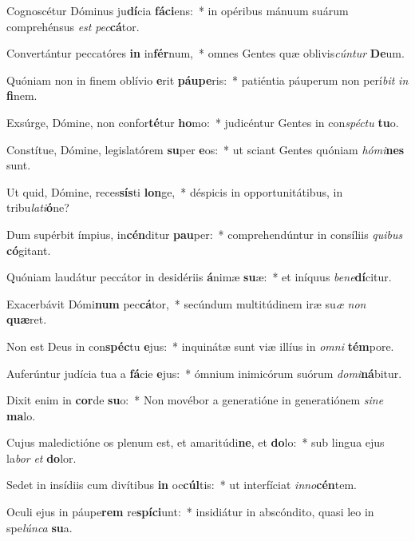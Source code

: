 \item Cognoscétur Dóminus ju\textbf{dí}cia \textbf{fá}\textbf{ci}ens:~* in opéribus mánuum suárum comprehénsus \textit{est} \textit{pec}\textbf{cá}tor.
\item Convertántur peccatóres \textbf{in} in\textbf{fér}num,~* omnes Gentes quæ oblivis\textit{cún}\textit{tur} \textbf{De}um.
\item Quóniam non in finem oblívio \textbf{e}rit \textbf{páu}\textbf{pe}ris:~* patiéntia páuperum non perí\textit{bit} \textit{in} \textbf{fi}nem.
\item Exsúrge, Dómine, non confor\textbf{té}tur \textbf{ho}mo:~* judicéntur Gentes in con\textit{spéc}\textit{tu} \textbf{tu}o.
\item Constítue, Dómine, legislatórem \textbf{su}per \textbf{e}os:~* ut sciant Gentes quóniam \textit{hó}\textit{mi}\textbf{nes} sunt.
\item Ut quid, Dómine, reces\textbf{sís}ti \textbf{lon}ge,~* déspicis in opportunitátibus, in tribu\textit{la}\textit{ti}\textbf{ó}ne?
\item Dum supérbit ímpius, in\textbf{cén}ditur \textbf{pau}per:~* comprehendúntur in consíliis \textit{qui}\textit{bus} \textbf{có}gitant.
\item Quóniam laudátur peccátor in desidériis \textbf{á}nimæ \textbf{su}æ:~* et iníquus \textit{be}\textit{ne}\textbf{dí}citur.
\item Exacerbávit Dómi\textbf{num} pec\textbf{cá}tor,~* secúndum multitúdinem iræ su\textit{æ} \textit{non} \textbf{quæ}ret.
\item Non est Deus in con\textbf{spéc}tu \textbf{e}jus:~* inquinátæ sunt viæ illíus in \textit{om}\textit{ni} \textbf{tém}pore.
\item Auferúntur judícia tua a \textbf{fá}cie \textbf{e}jus:~* ómnium inimicórum suórum \textit{do}\textit{mi}\textbf{ná}bitur.
\item Dixit enim in \textbf{cor}de \textbf{su}o:~* Non movébor a generatióne in generatiónem \textit{si}\textit{ne} \textbf{ma}lo.
\item Cujus maledictióne os plenum est, et amaritúdi\textbf{ne}, et \textbf{do}lo:~* sub lingua ejus la\textit{bor} \textit{et} \textbf{do}lor.
\item Sedet in insídiis cum divítibus \textbf{in} oc\textbf{cúl}tis:~* ut interfíciat \textit{in}\textit{no}\textbf{cén}tem.
\item Oculi ejus in páupe\textbf{rem} re\textbf{spí}\textbf{ci}unt:~* insidiátur in abscóndito, quasi leo in spe\textit{lún}\textit{ca} \textbf{su}a.

